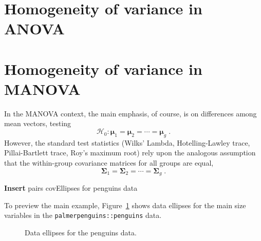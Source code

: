 \documentclass[
  letterpaper,
  10pt,
  krantz2]{krantz}
\begin{document}
\section{Homogeneity of variance in ANOVA}\label{sec-mlevene}

\section{Homogeneity of variance in
MANOVA}\label{sec-homogeneity-MANOVA}

In the MANOVA context, the main emphasis, of course, is on differences
among mean vectors, testing \[
\mathcal{H}_0 : \mathbf{\mu}_1 = \mathbf{\mu}_2 = \cdots = \mathbf{\mu}_g \; .
\] However, the standard test statistics (Wilks' Lambda,
Hotelling-Lawley trace, Pillai-Bartlett trace, Roy's maximum root) rely
upon the analogous assumption that the within-group covariance matrices
for all groups are equal, \[
\mathbf{\Sigma}_1 = \mathbf{\Sigma}_2 = \cdots = \mathbf{\Sigma}_g \; .
\]

\textbf{Insert} pairs covEllipses for penguins data

To preview the main example, Figure~\ref{fig-peng-covEllipse0} shows
data ellipses for the main size variables in the
\texttt{palmerpenguins::penguins} data.

\begin{figure}


\caption{\label{fig-peng-covEllipse0}Data ellipses for the penguins
data.}

\end{figure}%
\end{document}
